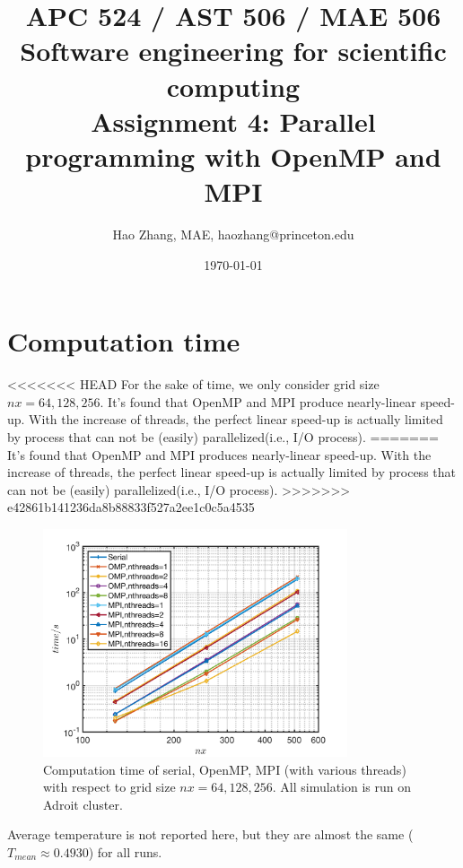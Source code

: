 \documentclass[a4paper]{article}
\title{APC 524 / AST 506 / MAE 506 Software engineering for scientific computing
\\Assignment 4: Parallel programming with OpenMP and MPI}
\author{Hao Zhang, MAE, haozhang@princeton.edu}
\date{\today}
\begin{document}
\maketitle

    \section{Computation time}
<<<<<<< HEAD
   For the sake of time, we only consider grid size $nx=64,128,256$. It's found that OpenMP and MPI produce nearly-linear speed-up. With the increase of threads, the perfect linear speed-up is actually limited by process that can not be (easily) parallelized(i.e., I/O process).
=======
    It's found that OpenMP and MPI produces nearly-linear speed-up. With the increase of threads, the perfect linear speed-up is actually limited by process that can not be (easily) parallelized(i.e., I/O process).
>>>>>>> e42861b141236da8b88833f527a2ee1c0c5a4535
      \begin{figure}[H]
            \centering 
            \includegraphics[width=0.8\textwidth]{./Figure/computation_time.png} 
        \caption{Computation time of serial, OpenMP, MPI (with various threads) with respect to grid size $nx=64,128,256$. All simulation is run on Adroit cluster.}
    \end{figure}
    
    Average temperature is not reported here, but they are almost the same ($T_{mean} \approx 0.4930$) for all runs.
    
\end{document}
